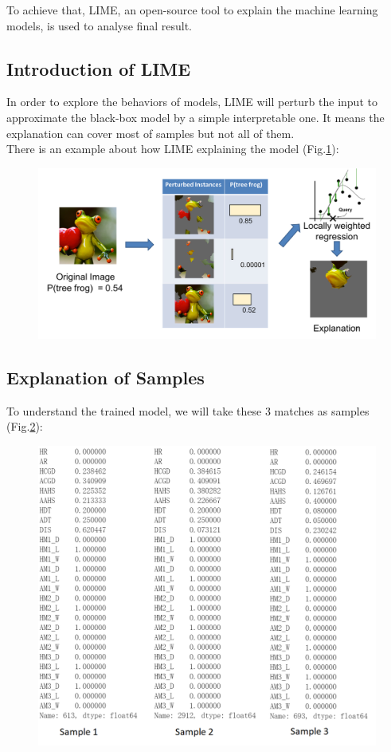 \documentclass{article}
\begin{document}
To achieve that, LIME, an open-source tool to explain the machine learning models, is used to analyse final result. 

\subsection{Introduction of LIME}
In order to explore the behaviors of models, LIME will perturb the input to approximate the black-box model by a simple interpretable one. It means the explanation can cover most of samples but not all of them.\\

There is an example about how LIME explaining the model (Fig.\ref{fig:LIMEintro}):

\begin{figure}[ht]
\centering
\includegraphics[scale=0.4]{graphs/LIMEintro.png}
\caption{}
\label{fig:LIMEintro}
\end{figure}

\subsection{Explanation of Samples}
To understand the trained model, we will take these 3 matches as samples (Fig.\ref{fig:LIMEsample}):

\begin{figure}[ht]
\centering
\includegraphics[scale=0.7]{graphs/LIMEsample.png}
\caption{}
\label{fig:LIMEsample}
\end{figure}
\end{document}
